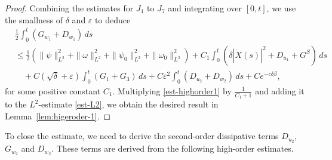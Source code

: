 \documentclass[11pt,reqno]{amsart}
\newtheorem{lemma}{Lemma}[section]
\newtheorem{remark}{Remark}[section]
\numberwithin{equation}{section} %
\newcommand{\e}{\varepsilon}
\begin{document}
\begin{proof}
Combining the estimates for $J_1$ to $J_7$ and integrating over $[0,t]$, we use the smallness of $\delta$ and $\e$ to deduce
\begin{equation} \label{est-highorder1}
\begin{aligned}
& \frac{1}{2}\int_0^t (G_{w_1} + D_{w_1}) \, ds  \\
&\le \frac{1}{2}(\|\psi\|_{L^2}^2+\|\omega\|_{L^2}^2+\|\psi_0\|_{L^2}^2+\|\omega_0\|_{L^2}^2)  + C_1 \int_0^t( \delta |\dot{X}(s)|^2 + D_{u_1} + G^S) \, ds \\
&\quad +C(\sqrt{\delta}+\e)\int_0^t(G_1+G_3)\,ds+C \varepsilon^2 \int_0^t  ( D_{u_2} + D_{w_2})\,ds + C e^{-c \delta \beta},
\end{aligned}
\end{equation}
for some positive constant $C_1$. Multiplying \eqref{est-highorder1} by $\frac{1}{C_1+1}$ and adding it to the $L^2$-estimate \eqref{est-L2}, we obtain the desired result in Lemma~\ref{lem:higeroder-1}.
\end{proof}

To close the estimate, we need to derive the second-order dissipative terms $D_{u_2}$, $G_{w_2}$ and $D_{w_2}$. These terms are derived from the following high-order estimates.


\end{document}
